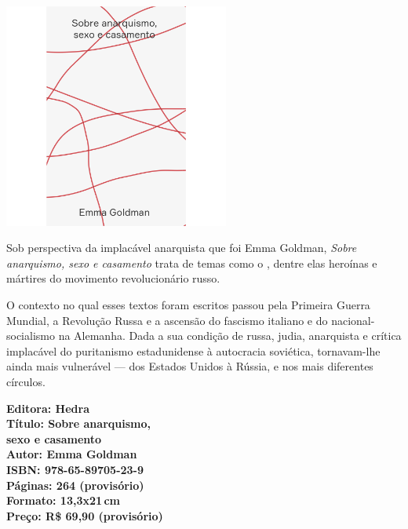 \begin{center}
\hspace*{.5cm}\includegraphics[width=74mm]{./CAPAS/HEDRA_GOLDMAN.jpg}
\end{center}
\hspace*{-7cm}\hrulefill\hspace*{-7cm}
\medskip

\noindent{}Sob perspectiva da implacável anarquista que foi Emma Goldman, \textit{Sobre anarquismo, sexo e casamento} trata de temas como o , dentre elas heroínas e mártires do movimento revolucionário russo. 

O contexto no qual esses textos foram escritos passou pela Primeira Guerra Mundial, a Revolução Russa e a ascensão do fascismo italiano e do nacional-socialismo na Alemanha. Dada a sua condição de russa, judia, anarquista e crítica implacável do puritanismo estadunidense à autocracia soviética, tornavam-lhe ainda mais vulnerável --- dos Estados Unidos à Rússia, e nos mais diferentes círculos.

\vfill
\noindent\begin{minipage}[c]{.5\linewidth}
{\small\textbf{
\hspace*{-.1cm}Editora: Hedra\\
Título: Sobre anarquismo,\\sexo e casamento\\
Autor: Emma Goldman\\ 
ISBN: 978-65-89705-23-9\\
Páginas: 264 (provisório)\\
Formato: 13,3x21\,cm\\
Preço: R\$ 69,90 (provisório)\\
}}
\end{minipage}
\pagebreak

